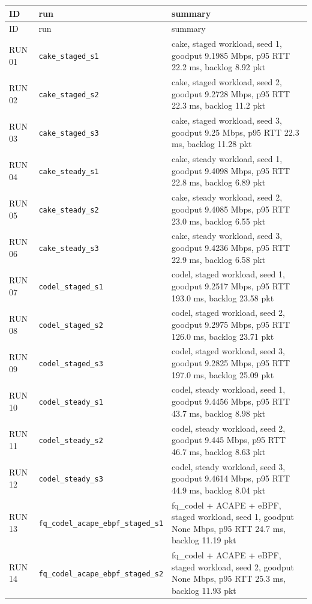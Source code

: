 \documentclass[11pt,a4paper]{article}
\begin{document}
\begin{longtable}{p{1.5cm}p{5.0cm}p{9.5cm}}
\toprule ID & run & summary \\ \midrule \endfirsthead
\toprule ID & run & summary \\ \midrule \endhead

RUN 01 & \texttt{cake\_staged\_s1} & cake, staged workload, seed 1, goodput 9.1985 Mbps, p95 RTT 22.2 ms, backlog 8.92 pkt \\
RUN 02 & \texttt{cake\_staged\_s2} & cake, staged workload, seed 2, goodput 9.2728 Mbps, p95 RTT 22.3 ms, backlog 11.2 pkt \\
RUN 03 & \texttt{cake\_staged\_s3} & cake, staged workload, seed 3, goodput 9.25 Mbps, p95 RTT 22.3 ms, backlog 11.28 pkt \\
RUN 04 & \texttt{cake\_steady\_s1} & cake, steady workload, seed 1, goodput 9.4098 Mbps, p95 RTT 22.8 ms, backlog 6.89 pkt \\
RUN 05 & \texttt{cake\_steady\_s2} & cake, steady workload, seed 2, goodput 9.4085 Mbps, p95 RTT 23.0 ms, backlog 6.55 pkt \\
RUN 06 & \texttt{cake\_steady\_s3} & cake, steady workload, seed 3, goodput 9.4236 Mbps, p95 RTT 22.9 ms, backlog 6.58 pkt \\
RUN 07 & \texttt{codel\_staged\_s1} & codel, staged workload, seed 1, goodput 9.2517 Mbps, p95 RTT 193.0 ms, backlog 23.58 pkt \\
RUN 08 & \texttt{codel\_staged\_s2} & codel, staged workload, seed 2, goodput 9.2975 Mbps, p95 RTT 126.0 ms, backlog 23.71 pkt \\
RUN 09 & \texttt{codel\_staged\_s3} & codel, staged workload, seed 3, goodput 9.2825 Mbps, p95 RTT 197.0 ms, backlog 25.09 pkt \\
RUN 10 & \texttt{codel\_steady\_s1} & codel, steady workload, seed 1, goodput 9.4456 Mbps, p95 RTT 43.7 ms, backlog 8.98 pkt \\
RUN 11 & \texttt{codel\_steady\_s2} & codel, steady workload, seed 2, goodput 9.445 Mbps, p95 RTT 46.7 ms, backlog 8.63 pkt \\
RUN 12 & \texttt{codel\_steady\_s3} & codel, steady workload, seed 3, goodput 9.4614 Mbps, p95 RTT 44.9 ms, backlog 8.04 pkt \\
RUN 13 & \texttt{fq\_codel\_acape\_ebpf\_staged\_s1} & fq\_codel + ACAPE + eBPF, staged workload, seed 1, goodput None Mbps, p95 RTT 24.7 ms, backlog 11.19 pkt \\
RUN 14 & \texttt{fq\_codel\_acape\_ebpf\_staged\_s2} & fq\_codel + ACAPE + eBPF, staged workload, seed 2, goodput None Mbps, p95 RTT 25.3 ms, backlog 11.93 pkt \\

\end{longtable}
\end{document}
